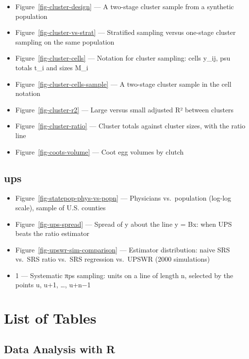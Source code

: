\documentclass[
  letterpaper,
  DIV=11,
  numbers=noendperiod]{scrreprt}
\providecommand{\tightlist}{%
  \setlength{\itemsep}{0pt}\setlength{\parskip}{0pt}}
\renewcommand{\[}{\begin{equation}}
\renewcommand{\]}{\end{equation}}
\begin{document}
\begin{itemize}
\tightlist
\item
  Figure~\ref{fig-cluster-design} --- A two-stage cluster sample from a
  synthetic population
\item
  Figure~\ref{fig-cluster-vs-strat} --- Stratified sampling versus
  one-stage cluster sampling on the same population
\item
  Figure~\ref{fig-cluster-cells} --- Notation for cluster sampling:
  cells y\_ij, psu totals t\_i and sizes M\_i
\item
  Figure~\ref{fig-cluster-cells-sample} --- A two-stage cluster sample
  in the cell notation
\item
  Figure~\ref{fig-cluster-r2} --- Large versus small adjusted R² between
  clusters
\item
  Figure~\ref{fig-cluster-ratio} --- Cluster totals against cluster
  sizes, with the ratio line
\item
  Figure~\ref{fig-coots-volume} --- Coot egg volumes by clutch
\end{itemize}

\subsection{ups}\label{ups}

\begin{itemize}
\tightlist
\item
  Figure~\ref{fig-statepop-phys-vs-popn} --- Physicians vs.~population
  (log-log scale), sample of U.S. counties
\item
  Figure~\ref{fig-ups-spread} --- Spread of y about the line y = Bx:
  when UPS beats the ratio estimator
\item
  Figure~\ref{fig-upswr-sim-comparison} --- Estimator distribution:
  naive SRS vs.~SRS ratio vs.~SRS regression vs.~UPSWR (2000
  simulations)
\item
  1 --- Systematic πps sampling: units on a line of length n, selected
  by the points u, u+1, \ldots, u+n−1
\end{itemize}

\section{List of Tables}\label{list-of-tables}

\subsection{Data Analysis with R}\label{data-analysis-with-r-2}
\end{document}
